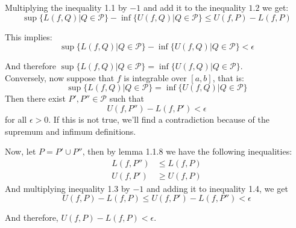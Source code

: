 \documentclass{report}
\begin{document}
    Multiplying the inequality 1.1 by $-1$ and add it to the inequality $1.2$ we get:
    $$
        \sup\{L(f, Q) | Q \in \mathcal{P}\} - \inf\{U(f, Q) | Q \in \mathcal{P}\} \leq U(f,P) - L(f,P)
    $$

    This implies:
    $$
        \sup\{L(f, Q) | Q \in \mathcal{P}\} - \inf\{U(f, Q) | Q \in \mathcal{P}\} < \epsilon
    $$

    And therefore $\sup\{L(f, Q) | Q \in \mathcal{P}\} = \inf\{U(f, Q) | Q \in \mathcal{P}\}$.\\

    Conversely, now suppose that $f$ is integrable over $[a,b]$, that is:
    $$\sup\{L(f, Q) | Q \in \mathcal{P}\} = \inf\{U(f, Q) | Q \in \mathcal{P}\}$$
    Then there exist $P', P'' \in \mathcal{P}$ such that $$U(f, P'') - L(f, P') < \epsilon$$ for all $\epsilon > 0$. If this is not true, we'll find a contradiction because of the supremum and infimum definitions.

    Now, let $P = P' \cup P''$, then by lemma 1.1.8 we have the following inequalities:
    \begin{align}
        L(f, P'') &\leq L(f, P)\\
        U(f, P') &\geq U(f, P)
    \end{align}
    And multiplying inequality 1.3 by $-1$ and adding it to inequality 1.4, we get
    $$U(f,P)-L(f, P) \leq U(f, P') - L(f, P'') < \epsilon$$

    And therefore, $U(f,P)-L(f, P) < \epsilon$.
\end{document}
